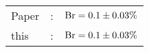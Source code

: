       \begin{tabular}{lcr}
          Paper &:& $\mathrm{Br}  = 0.1\pm 0.03\%$ \\
          this      &:& $\mathrm{Br}  = 0.1\pm 0.03\%$ \\        
      \end{tabular}
